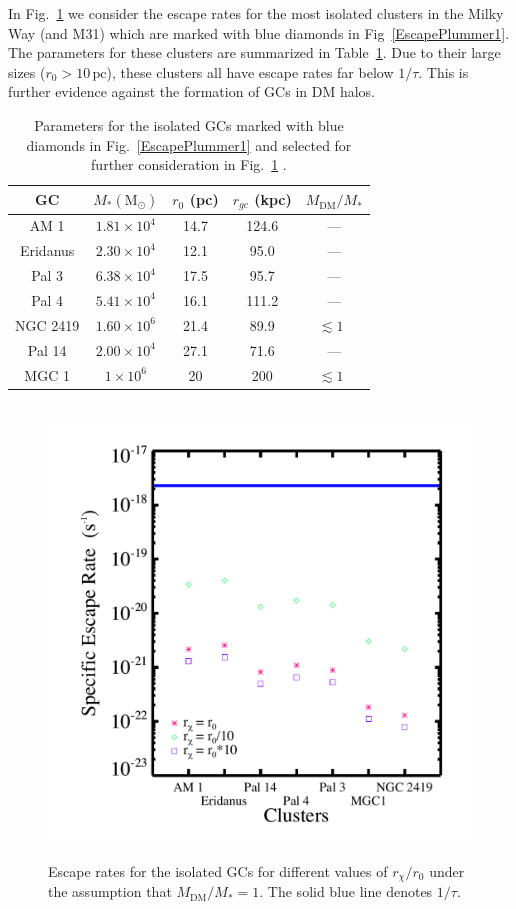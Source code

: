 \documentclass[aps,floatfix,prd,showpacs]{revtex4}
\newcommand{\rx}{r_\chi}
\newcommand{\MDM}{M_{\mathrm{DM}}}
\newcommand{\pc}{\textrm{pc}}
\begin{document}
In Fig.~\ref{var_rad_iso} we consider the escape rates for the most isolated clusters in the Milky Way (and M31) which are marked with blue diamonds in Fig~\ref{EscapePlummer1}.  The parameters for these clusters are summarized in Table~\ref{table_iso}.  Due to their large sizes ($r_0 > 10\, \pc$), these clusters all have escape rates far below $1/\tau$.  This is further evidence against the formation of GCs in DM halos.  
%
\begin{table}
\begin{tabular}{ | c | c | c | c | c |}
	\hline
	GC & $M_* (\mathrm{M}_\odot)$ & $r_0$ (pc) & $r_{gc}$ (kpc) & $\MDM/M_*$\\
	\hline
  	AM 1 & $1.81\times10^4$ & 14.7 & 124.6 & ---\\
  	Eridanus & $2.30\times10^4$ & 12.1 & 95.0 & ---\\
	Pal 3 & $6.38\times10^4$ & 17.5 & 95.7 &---\\
	Pal 4 & $5.41\times10^4$ & 16.1 & 111.2 & ---\\
	NGC 2419 & $1.60\times10^6$ & 21.4& 89.9 &$\lesssim 1$\ \cite{Conroy,Ibata2013} \\
	Pal 14 & $2.00\times10^4$ & 27.1 & 71.6 & --- \\
	MGC 1 & $1\times10^6$ & 20 & 200 & $\lesssim 1$\ \cite{Conroy}  \\
	\hline
\end{tabular}
\caption{Parameters for the isolated GCs marked with blue diamonds in Fig.~\ref{EscapePlummer1} and selected for further consideration in Fig.~\ref{var_rad_iso} \cite{Harris}.}
\label{table_iso}
\end{table}
%
\begin{figure}[htp]
\centering
\includegraphics[width=12cm, height=12cm]{var_rad_iso}
\caption{Escape rates for the isolated GCs for different values of $\rx/r_0$ under the assumption that $\MDM/M_* = 1$.  The solid blue line denotes $1/\tau$.}  
\label{var_rad_iso}
\end{figure}
%
%
\end{document}
